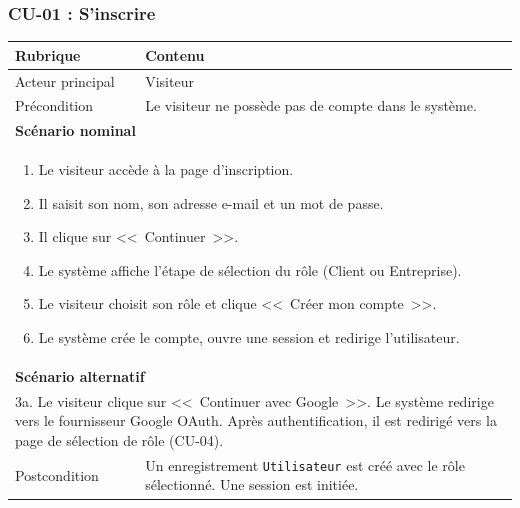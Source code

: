 \documentclass[12pt,a4paper]{article}
\begin{document}
\subsubsection{CU-01 : S'inscrire}
\begin{table}[h!]
\centering
\begin{tabular}{p{3.5cm}p{10cm}}
\toprule
\textbf{Rubrique} & \textbf{Contenu} \\
\midrule
Acteur principal & Visiteur \\
Précondition & Le visiteur ne possède pas de compte dans le système. \\
\midrule
\multicolumn{2}{l}{\textbf{Scénario nominal}} \\
\midrule
\multicolumn{2}{p{14cm}}{%
\begin{enumerate}[nosep]
    \item Le visiteur accède à la page d'inscription.
    \item Il saisit son nom, son adresse e-mail et un mot de passe.
    \item Il clique sur <<~Continuer~>>.
    \item Le système affiche l'étape de sélection du rôle (Client ou Entreprise).
    \item Le visiteur choisit son rôle et clique <<~Créer mon compte~>>.
    \item Le système crée le compte, ouvre une session et redirige l'utilisateur.
\end{enumerate}} \\
\midrule
\multicolumn{2}{l}{\textbf{Scénario alternatif}} \\
\midrule
\multicolumn{2}{p{14cm}}{%
3a. Le visiteur clique sur <<~Continuer avec Google~>>. Le système redirige vers le fournisseur Google OAuth. Après authentification, il est redirigé vers la page de sélection de rôle (CU-04).} \\
\midrule
Postcondition & Un enregistrement \texttt{Utilisateur} est créé avec le rôle sélectionné. Une session est initiée. \\
\bottomrule
\end{tabular}
\end{table}
\end{document}
